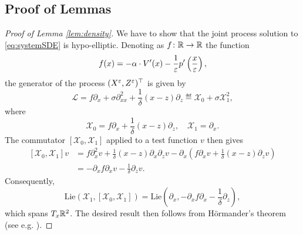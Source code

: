 \documentclass[10pt]{article}
\begin{document}
\begin{appendices}
	
\section{Proof of Lemmas}\label{ap:Proofs}

\begin{proof}[Proof of Lemma \ref{lem:density}] We have to show that the joint process solution to \eqref{eq:systemSDE} is hypo-elliptic. Denoting as $f\colon \mathbb{R} \to \mathbb{R}$ the function 
	\begin{equation}
	f(x) = -\alpha \cdot V'(x) - \frac1{\varepsilon} p'\left(\frac{x}{\varepsilon}\right),
	\end{equation}
	the generator of the process $(X^\varepsilon, Z^\varepsilon)^\top$ is given by
	\begin{equation}
	\mathcal L = f \partial_x + \sigma \partial_{xx}^2 + \frac1\delta (x - z)\partial_z \eqdef \mathcal X_0 + \sigma \mathcal X_1^2, 
	\end{equation}
	where 
	\begin{equation}
	\mathcal X_0 = f \partial_x + \frac1\delta (x - z)\partial_z, \quad \mathcal X_1 = \partial_x.
	\end{equation}
	The commutator $[\mathcal X_0, \mathcal X_1]$ applied to a test function $v$ then gives
	\begin{equation}
	\begin{aligned}
	[\mathcal X_0, \mathcal X_1]v &= f \partial_x^2 v + \frac1\delta (x - z) \partial_x \partial_z v  - \partial_x\left(f\partial_x v + \frac1\delta (x - z)\partial_z v\right)\\
	&= -\partial_x f \partial_x v - \frac1\delta \partial_z v.
	\end{aligned}
	\end{equation}
	Consequently, 
	\begin{equation}
	\mathrm{Lie}\left(\mathcal X_1, [\mathcal X_0, \mathcal X_1]\right) = \mathrm{Lie} \left(\partial_x, -\partial_x f \partial_x - \frac1\delta\partial_z\right),
	\end{equation}
	which spans $T_x\mathbb{R}^2$. The desired result then follows from Hörmander's theorem (see e.g. \cite[Chapter 6]{Pav14}).
\end{proof}


\end{appendices}
\end{document}
